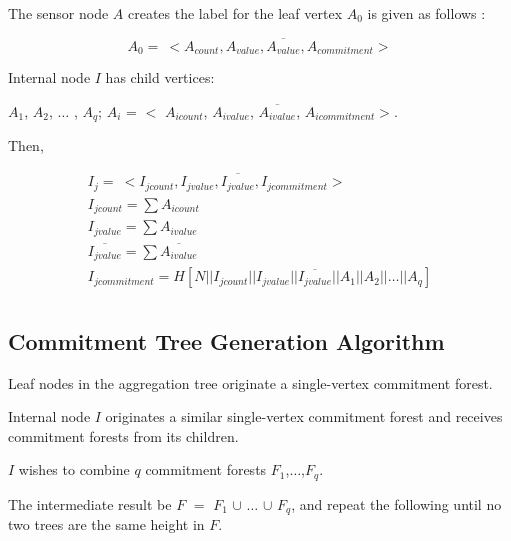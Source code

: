 \documentclass[%
  slidesonly,%
  semlayer%
  ]{seminar}                                  %
\begin{document}
\begin{slide}
      The sensor node $A$ creates the label for the leaf vertex $A_{0}$ is given as follows :
      \begin{tiny}
      \begin{equation*}
        A_{0} =\ <A_{count}, A_{value}, \overline{A_{value}}, A_{commitment}>
      \end{equation*}
      \end{tiny}
      Internal node $I$ has child vertices:
      \begin{tiny}
       $A_{1}$, $A_{2}$, $\dotsc$ , $A_{q}$; $A_{i}$ = $<$ $A_{icount}$, $A_{ivalue}$, $\overline{A_{ivalue}}$, $A_{icommitment}$$>$.
      \end{tiny}
      Then,
      \begin{tiny}
        \begin{equation*}
          \begin{array}{l}
            I_{j} =\ <I_{jcount}, I_{jvalue}, \overline{I_{jvalue}}, I_{jcommitment}>\\
            I_{jcount} = \sum A_{icount}\\ 
            I_{jvalue} = \sum A_{ivalue}\\
            \overline{I_{jvalue}} = \sum \overline{A_{ivalue}}\\
            I_{jcommitment} = H[N||I_{jcount}||I_{jvalue}||\overline{I_{jvalue}}||A_{1}||A_{2}|| \dotsc ||A_{q}]\\
          \end{array}
        \end{equation*}
      \end{tiny}
      
      \vfill
      \clearpage

    \subsection*{Commitment Tree Generation Algorithm}
      \vfill
      Leaf nodes in the aggregation tree originate a single-vertex commitment forest.

      Internal node $I$ originates a similar single-vertex commitment forest and receives commitment forests from its children.
      
      $I$ wishes to combine $q$ commitment forests $F_{1}$,$\dotsc$,$F_{q}$.
      
      The intermediate result be $F$ $=$ $F_{1}$ $\cup$ $\dotsc$ $\cup$ $F_{q}$, and repeat the following until no two trees are the same height in $F$.
      

\end{slide}
\end{document}
